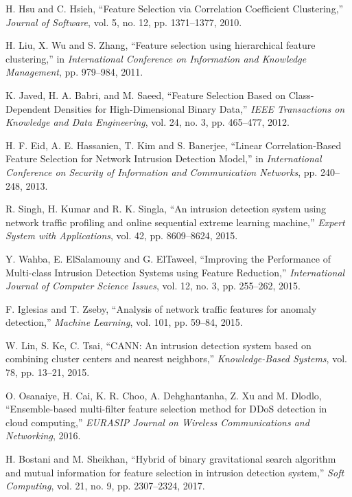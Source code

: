 \documentclass{ieeeaccess}
\theoremstyle{definition}
\begin{document}
\begin{thebibliography}{00}
    H. Hsu and C. Hsieh, ``Feature Selection via Correlation Coefficient Clustering,'' \emph{Journal of Software}, vol. 5, no. 12, pp. 1371--1377, 2010.

    H. Liu, X. Wu and S. Zhang, ``Feature selection using hierarchical feature clustering,'' in \emph{International Conference on Information and Knowledge Management}, pp. 979--984, 2011.

    K. Javed, H. A. Babri, and M. Saeed, ``Feature Selection Based on Class-Dependent Densities for High-Dimensional Binary Data,'' \emph{IEEE Transactions on Knowledge and Data Engineering}, vol. 24, no. 3, pp. 465--477, 2012.

    H. F. Eid, A. E. Hassanien, T. Kim and S. Banerjee, ``Linear Correlation-Based Feature Selection for Network Intrusion Detection Model,'' in \emph{International Conference on Security of Information and Communication Networks}, pp. 240--248, 2013.

    R. Singh, H. Kumar and R. K. Singla, ``An intrusion detection system using network traffic profiling and online sequential extreme learning machine,'' \emph{Expert System with Applications}, vol. 42, pp. 8609--8624, 2015.

    Y. Wahba, E. ElSalamouny and G. ElTaweel, ``Improving the Performance of Multi-class Intrusion Detection Systems using Feature Reduction,'' \emph{International Journal of Computer Science Issues}, vol. 12, no. 3, pp. 255--262, 2015.

    F. Iglesias and T. Zseby, ``Analysis of network traffic features for anomaly detection,'' \emph{Machine Learning}, vol. 101, pp. 59--84, 2015.

    W. Lin, S. Ke, C. Tsai, ``CANN: An intrusion detection system based on combining cluster centers and nearest neighbors,'' \emph{Knowledge-Based Systems}, vol. 78, pp. 13--21, 2015.

    O. Osanaiye, H. Cai, K. R. Choo, A. Dehghantanha, Z. Xu and M. Dlodlo, ``Ensemble-based multi-filter feature selection method for DDoS detection in cloud computing,'' \emph{EURASIP Journal on Wireless Communications and Networking}, 2016.

    H. Bostani and M. Sheikhan, ``Hybrid of binary gravitational search algorithm and mutual information for feature selection in intrusion detection system,'' \emph{Soft Computing}, vol. 21, no. 9, pp. 2307--2324, 2017.


\end{thebibliography}
\end{document}
